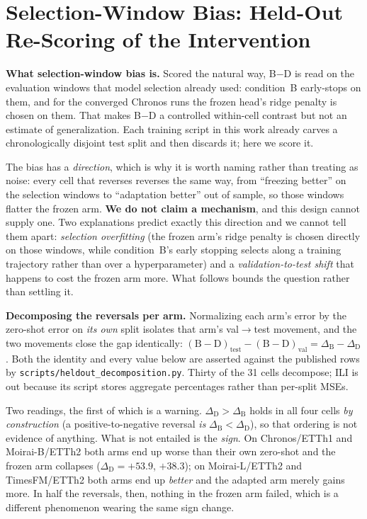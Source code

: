 \documentclass{article}
\begin{document}
\section{Selection-Window Bias: Held-Out Re-Scoring of the Intervention}
\label{app:heldout}

\textbf{What selection-window bias is.} Scored the natural way, B$-$D is read on the evaluation
windows that model selection already used: condition~B early-stops on them, and for the converged
Chronos runs the frozen head's ridge penalty is chosen on them. That makes B$-$D a controlled
within-cell contrast but not an estimate of generalization. Each training script in this work
already carves a chronologically disjoint test split and then discards it; here we score it.

The bias has a \emph{direction}, which is why it is worth naming rather than treating as noise: every
cell that reverses reverses the same way, from ``freezing better'' on the selection windows to
``adaptation better'' out of sample, so those windows flatter the frozen arm. \textbf{We do not claim
a mechanism}, and this design cannot supply one. Two explanations predict exactly this direction and
we cannot tell them apart: \emph{selection overfitting} (the frozen arm's ridge penalty is chosen
directly on those windows, while condition~B's early stopping selects along a training trajectory
rather than over a hyperparameter) and a \emph{validation-to-test shift} that happens to cost the
frozen arm more. What follows bounds the question rather than settling it.

\textbf{Decomposing the reversals per arm.} Normalizing each arm's error by the zero-shot error on
\emph{its own} split isolates that arm's val$\to$test movement, and the two movements close the gap
identically: $(\text{B}{-}\text{D})_\text{test} - (\text{B}{-}\text{D})_\text{val} =
\Delta_\text{B} - \Delta_\text{D}$. Both the identity and every value below are asserted against the
published rows by \texttt{scripts/heldout\_decomposition.py}. Thirty of the 31 cells decompose; ILI
is out because its script stores aggregate percentages rather than per-split MSEs.



\noindent Two readings, the first of which is a warning. $\Delta_\text{D}>\Delta_\text{B}$ holds in
all four cells \emph{by construction} (a positive-to-negative reversal \emph{is}
$\Delta_\text{B}<\Delta_\text{D}$), so that ordering is not evidence of anything. What is not
entailed is the \emph{sign}. On Chronos/ETTh1 and Moirai-B/ETTh2 both arms end up worse than their own
zero-shot and the frozen arm collapses ($\Delta_\text{D}={+}53.9$, ${+}38.3$); on Moirai-L/ETTh2 and
TimesFM/ETTh2 both arms end up \emph{better} and the adapted arm merely gains more. In half the
reversals, then, nothing in the frozen arm failed, which is a different phenomenon wearing the same
sign change.
\end{document}

